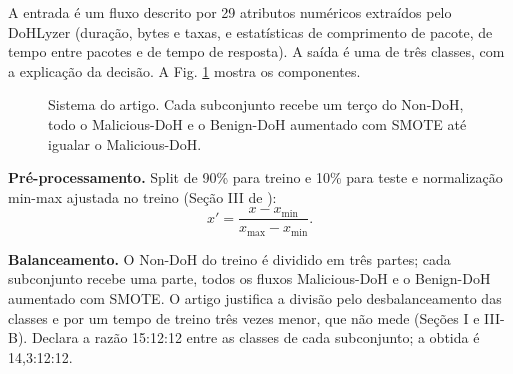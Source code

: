\documentclass[conference]{IEEEtran}
\begin{document}
A entrada é um fluxo descrito por 29 atributos numéricos extraídos pelo DoHLyzer (duração, bytes e taxas, e estatísticas de comprimento de pacote, de tempo entre pacotes e de tempo de resposta). A saída é uma de três classes, com a explicação da decisão. A Fig. \ref{fig:pipeline} mostra os componentes.

\begin{figure}[!t]
\centering
{}
\caption{Sistema do artigo. Cada subconjunto recebe um terço do Non-DoH, todo o Malicious-DoH e o Benign-DoH aumentado com SMOTE até igualar o Malicious-DoH.}
\label{fig:pipeline}
\end{figure}

\textbf{Pré-processamento.} Split de 90\% para treino e 10\% para teste e normalização min-max ajustada no treino (Seção III de \cite{zebin2022}):
\begin{equation}
x' = \frac{x - x_{\min}}{x_{\max} - x_{\min}}.
\label{eq:minmax}
\end{equation}

\textbf{Balanceamento.} O Non-DoH do treino é dividido em três partes; cada subconjunto recebe uma parte, todos os fluxos Malicious-DoH e o Benign-DoH aumentado com SMOTE. O artigo justifica a divisão pelo desbalanceamento das classes e por um tempo de treino três vezes menor, que não mede (Seções I e III-B). Declara a razão 15:12:12 entre as classes de cada subconjunto; a obtida é 14,3:12:12.
\end{document}
